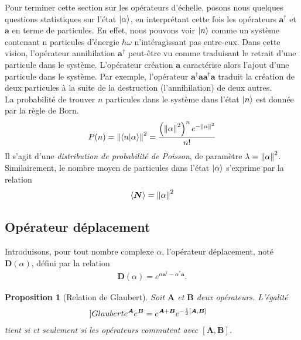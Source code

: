 \documentclass[11pt,oneside,a4paper]{article}
\newcommand{\h}{\ensuremath{\hbar}}
\newtheorem{property}[theorem]{Proposition}
\begin{document}
Pour terminer cette section sur les opérateurs d'échelle, posons nous quelques questions statistiques sur l'état $\ket{\alpha}$, en interprétant cette fois les opérateurs $\bm{a}^\dagger$ et $\bm{a}$ en terme de particules. En effet, nous pouvons voir $\ket{n}$ comme un système contenant n particules d'énergie $\h\omega$ n'intéragissant pas entre-eux. Dans cette vision, l'opérateur annihilation $\bm{a}^\dagger$ peut-être vu comme traduisant le retrait d'une particule dans le système. L'opérateur création $\bm{a}$ caractérise alors l'ajout d'une particule dans le système. Par exemple, l'opérateur $\bm{a}^\dagger\bm{a}\bm{a}^\dagger\bm{a}$ traduit la création de deux particules à la suite de la destruction (l'annihilation) de deux autres.\\

La probabilité de trouver $n$ particules dans le système dans l'état $\ket{n}$ est donnée par la règle de Born.
\begin{align}
  P(n) = \norm{\braket{n}{\alpha}}^2 = \frac{\left(\norm{\alpha}^{2}\right)^ne^{-\norm{\alpha}^2}}{n!}
\end{align}
Il s'agit d'une \emph{distribution de probabilité de Poisson}, de paramètre $\lambda = \norm{\alpha}^2$.\\

Similairement, le nombre moyen de particules dans l'état $\ket{\alpha}$ s'exprime par la relation
\begin{align}
  \expval{\bm{N}} = \norm{\alpha}^2
\end{align}

\subsection{Opérateur déplacement}
Introduisons, pour tout nombre complexe $\alpha$, l'opérateur déplacement, noté $\bm{D}(\alpha)$, défini par la relation
\begin{align}
  \bm{D}(\alpha) = e^{\alpha \bm{a}^\dagger-\alpha^*\bm{a}}.
\end{align}

\begin{property}[Relation de Glaubert]
  \label{prop Glaubert}
  Soit $\bm{A}$ et $\bm{B}$ deux opérateurs. L'égalité
  \begin{align}
    \label[]{Glaubert}
    e^{\bm{A}}e^{\bm{B}} &= e^{\bm{A}+\bm{B}}e^{-\frac{1}{2}\left[\bm{A},\bm{B}\right]}
  \end{align}
  tient si et seulement si les opérateurs commutent avec $\left[\bm{A},\bm{B}\right]$.
\end{property}
\end{document}
